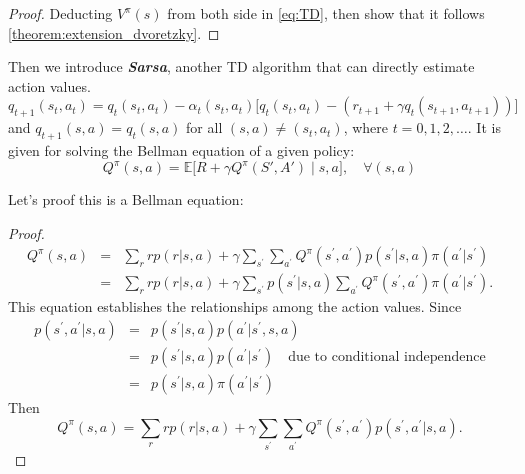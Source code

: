 \documentclass[10pt]{elegantbook}
\newcommand{\mydefination}[1]{\textbf{\textit{\textcolor{structurecolor}{#1}}}}
\begin{document}
\begin{proof}
    Deducting $V^{\pi}(s)$ from both side in \ref{eq:TD}, then show that it follows \ref{theorem:extension_dvoretzky}.
\end{proof}

Then we introduce \mydefination{Sarsa}, another TD algorithm that can directly estimate action values.
\begin{equation} \label{eq:sara_TD}
    q_{t+1}(s_t, a_t) = q_t(s_t, a_t) - \alpha_t(s_t, a_t) \big [ q_t(s_t, a_t) - (r_{t+1} + \gamma q_t(s_{t+1}, a_{t+1})) \big ]
\end{equation}
and $q_{t+1}(s, a) = q_t(s, a)$ for all $(s,a) \neq (s_t, a_t)$, where $t = 0, 1, 2, \ldots$.
It is given for solving the Bellman equation of a given policy:
\begin{equation}
    Q^{\pi}(s, a) = \mathbb E \big [ R + \gamma Q^{\pi}(S', A') \mid s, a \big ], \quad \forall (s, a)
\end{equation}

Let's proof this is a Bellman equation:
\begin{proof}
    \[
    \begin{array}{lll}
        Q^{\pi}(s,a) &=& \sum_{r}r p(r|s,a)+\gamma\sum_{s^{\prime}}\sum_{a^{\prime}}Q^{\pi}(s^{\prime},a^{\prime})p(s^{\prime}|s,a)\pi(a^{\prime}|s^{\prime}) \\ 
        &=& \sum_{r}r p(r|s,a)+\gamma\sum_{s^{\prime}}p(s^{\prime}|s,a)\sum_{a^{\prime}}Q^{\pi}(s^{\prime},a^{\prime})\pi(a^{\prime}|s^{\prime}).
    \end{array}
    \]
    This equation establishes the relationships among the action values. Since
    \[
    \begin{array}{lll}
        p(s^{\prime},a^{\prime}|s,a) &=& p(s^{\prime}|s,a)p(a^{\prime}|s^{\prime},s,a) \\ 
        &=& p(s^{\prime}|s,a)p(a^{\prime}|s^{\prime}) \quad \text{due to conditional independence} \\ 
        &=& p(s^{\prime}|s,a)\pi(a^{\prime}|s^{\prime})
    \end{array}
    \]
    Then
    \[
        Q^{\pi}(s,a)=\sum_{r}r p(r|s,a)+\gamma\sum_{s^{\prime}}\sum_{a^{\prime}}Q^{\pi}(s^{\prime},a^{\prime})p(s^{\prime},a^{\prime}|s,a).
    \]
\end{proof}
\end{document}
